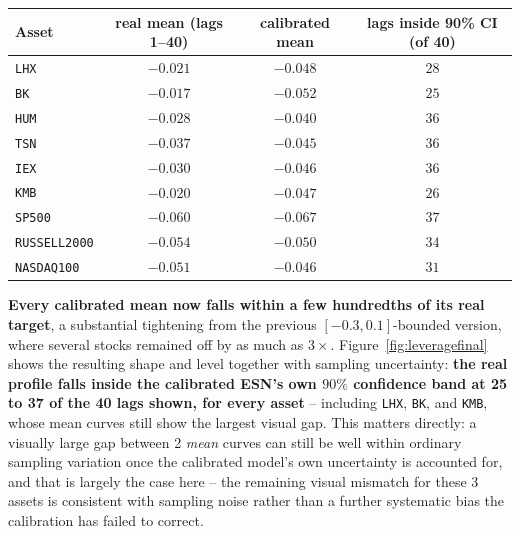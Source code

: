 \documentclass[11pt]{article}
\begin{document}
\begin{center}
\begin{tabular}{lccc}
\toprule
Asset & real mean (lags 1--40) & calibrated mean & lags inside 90\% CI (of 40) \\
\midrule
\texttt{LHX}         & $-0.021$ & $-0.048$ & $28$ \\
\texttt{BK}          & $-0.017$ & $-0.052$ & $25$ \\
\texttt{HUM}         & $-0.028$ & $-0.040$ & $36$ \\
\texttt{TSN}         & $-0.037$ & $-0.045$ & $36$ \\
\texttt{IEX}         & $-0.030$ & $-0.046$ & $36$ \\
\texttt{KMB}         & $-0.020$ & $-0.047$ & $26$ \\
\texttt{SP500}       & $-0.060$ & $-0.067$ & $37$ \\
\texttt{RUSSELL2000} & $-0.054$ & $-0.050$ & $34$ \\
\texttt{NASDAQ100}   & $-0.051$ & $-0.046$ & $31$ \\
\bottomrule
\end{tabular}
\end{center}

\textbf{Every calibrated mean now falls within a few hundredths of its real
target}, a substantial tightening from the previous $[-0.3,0.1]$-bounded
version, where several stocks remained off by as much as $3\times$.
Figure~\ref{fig:leveragefinal} shows the resulting shape and level together
with sampling uncertainty: \textbf{the real profile falls inside the
calibrated ESN's own $90\%$ confidence band at 25 to 37 of the 40 lags
shown, for every asset} -- including \texttt{LHX}, \texttt{BK}, and
\texttt{KMB}, whose mean curves still show the largest visual gap. This
matters directly: a visually large gap between 2 \emph{mean} curves can
still be well within ordinary sampling variation once the calibrated
model's own uncertainty is accounted for, and that is largely the case
here -- the remaining visual mismatch for these 3 assets is consistent with
sampling noise rather than a further systematic bias the calibration has
failed to correct.
\end{document}
